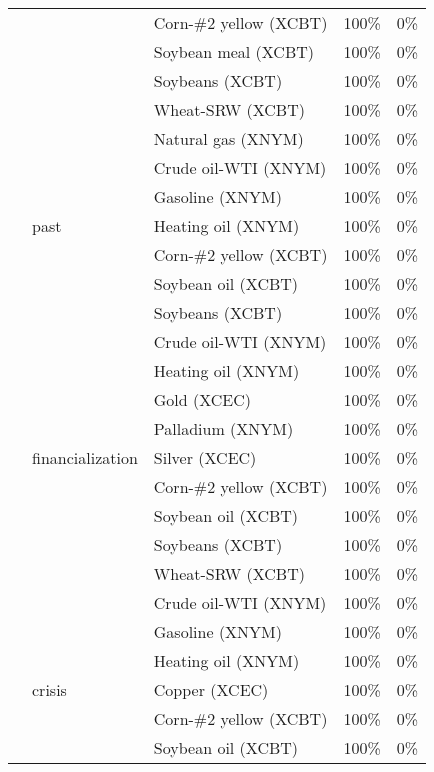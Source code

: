 \documentclass[]{elsarticle} %
\begin{document}
\begin{longtable}[t]{>{}lllrr}
\endfoot
\bottomrule
\endlastfoot
 &  & Corn-\#2 yellow (XCBT) & 100\% & 0\%\\
\nopagebreak
 &  & Soybean meal (XCBT) & 100\% & 0\%\\
\nopagebreak
 &  & Soybeans (XCBT) & 100\% & 0\%\\
\nopagebreak
 &  & Wheat-SRW (XCBT) & 100\% & 0\%\\
\nopagebreak
 &  & Natural gas (XNYM) & 100\% & 0\%\\
\nopagebreak
 &  & Crude oil-WTI (XNYM) & 100\% & 0\%\\
\nopagebreak
 &  & Gasoline (XNYM) & 100\% & 0\%\\
\nopagebreak
 & \multirow[t]{-8}{*}{\raggedright\arraybackslash past} & Heating oil (XNYM) & 100\% & 0\%\\
\nopagebreak
 &  & Corn-\#2 yellow (XCBT) & 100\% & 0\%\\
\nopagebreak
 &  & Soybean oil (XCBT) & 100\% & 0\%\\
\nopagebreak
 &  & Soybeans (XCBT) & 100\% & 0\%\\
\nopagebreak
 &  & Crude oil-WTI (XNYM) & 100\% & 0\%\\
\nopagebreak
 &  & Heating oil (XNYM) & 100\% & 0\%\\
\nopagebreak
 &  & Gold (XCEC) & 100\% & 0\%\\
\nopagebreak
 &  & Palladium (XNYM) & 100\% & 0\%\\
\nopagebreak
 & \multirow[t]{-8}{*}{\raggedright\arraybackslash financialization} & Silver (XCEC) & 100\% & 0\%\\
\nopagebreak
 &  & Corn-\#2 yellow (XCBT) & 100\% & 0\%\\
\nopagebreak
 &  & Soybean oil (XCBT) & 100\% & 0\%\\
\nopagebreak
 &  & Soybeans (XCBT) & 100\% & 0\%\\
\nopagebreak
 &  & Wheat-SRW (XCBT) & 100\% & 0\%\\
\nopagebreak
 &  & Crude oil-WTI (XNYM) & 100\% & 0\%\\
\nopagebreak
 &  & Gasoline (XNYM) & 100\% & 0\%\\
\nopagebreak
 &  & Heating oil (XNYM) & 100\% & 0\%\\
\nopagebreak
 & \multirow[t]{-8}{*}{\raggedright\arraybackslash crisis} & Copper (XCEC) & 100\% & 0\%\\
\nopagebreak
 &  & Corn-\#2 yellow (XCBT) & 100\% & 0\%\\
\nopagebreak
 &  & Soybean oil (XCBT) & 100\% & 0\%\\

\end{longtable}
\end{document}
